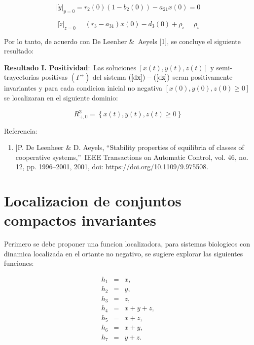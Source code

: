 \documentclass[letterpaper,11pt]{article}
\begin{document}
\begin{equation*}
\left\vert \dot{y}\right\vert _{y=0}=r_{2}\left( 0\right) (1-b_{2}\left(
0\right) )-a_{21}x\left( 0\right) =0
\end{equation*}

\begin{equation*}
\left\vert \dot{z}\right\vert _{z=0}=(r_{3}-a_{31})x\left( 0\right)
-d_{3}\left( 0\right) +\rho _{i}=\rho _{i}
\end{equation*}

Por lo tanto, de acuerdo con De Leenher \&\ Aeyels [1], se concluye el
siguiente resultado:

\bigskip

\textbf{Resultado I. Positividad}:\ Las soluciones $[x(t),y\left( t\right)
,z\left( t\right) ]$ y semi-trayectorias positivas $(\Gamma ^{+})$ del
sistema $\left( \ref{dx}\right) -\left( \ref{dz}\right) $ seran
positivamente invariantes y para cada condicion inicial no negativa $%
[x\left( 0\right) ,y\left( 0\right) ,z\left( 0\right) \geq 0]$ se
localizaran en el siguiente dominio:

\begin{equation*}
R_{+,0}^{3}=\left\{ x\left( t\right) ,y\left( t\right) ,z\left( t\right)
\geq 0\right\}
\end{equation*}

Referencia:

\begin{enumerate}
\item {}]P. De Leenheer \& D. Aeyels, \textquotedblleft Stability
properties of equilibria of classes of cooperative
systems,\textquotedblright\ IEEE Transactions on Automatic Control, vol. 46,
no. 12, pp. 1996--2001, 2001, doi: https://doi.org/10.1109/9.975508.
\end{enumerate}

\section{Localizacion de conjuntos compactos invariantes}

Perimero se debe proponer una funcion localizadora, para sistemas biologicos
con dinamica localizada en el ortante no negativo, se sugiere explorar las
siguientes funciones:

\begin{eqnarray*}
h_{1} &=&x, \\
h_{2} &=&y, \\
h_{3} &=&z, \\
h_{4} &=&x+y+z, \\
h_{5} &=&x+z, \\
h_{6} &=&x+y, \\
h_{7} &=&y+z.
\end{eqnarray*}
\end{document}
